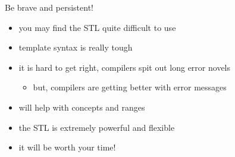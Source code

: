 \begin{frame}[fragile]
  \begin{exampleblock}{Be brave and persistent!}
    \begin{itemize}
    \item you may find the STL quite difficult to use
    \item template syntax is really tough
    \item it is hard to get right, compilers spit out long error novels
    \begin{itemize}
      \item but, compilers are getting better with error messages
    \end{itemize}
    \item {} will help with concepts and ranges
    \item the STL is extremely powerful and flexible
    \item it will be worth your time!
    \end{itemize}
  \end{exampleblock}
\end{frame}
